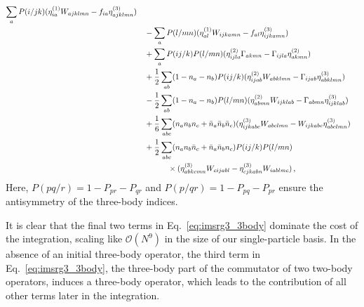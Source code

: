 \begin{align}
\begin{aligned}
    \sum_{a} P(i/jk) (\eta^{(1)}_{ia} W_{ajklmn} - f_{ia} \eta^{(3)}_{ajklmn})                                                     \\
                                      & \quad - \sum_{a} P(l/mn) (\eta^{(1)}_{al} W_{ijkamn} - f_{al} \eta^{(3)}_{ijkamn})         \\
                                      & \quad + \sum_{a} P(ij/k) P(l/mn)
    (\eta^{(2)}_{ijla} \Gamma_{akmn} - \Gamma_{ijla} \eta^{(2)}_{akmn})                                                              \\
                                      & \quad + \frac{1}{2} \sum_{ab} (1 - n_a - n_b) P(ij/k)
    (\eta^{(2)}_{ijab} W_{abklmn} - \Gamma_{ijab} \eta^{(3)}_{abklmn})                                                             \\
                                      & \quad - \frac{1}{2} \sum_{ab} (1 - n_a - n_b) P(l/mn)
    (\eta^{(2)}_{abmn} W_{ijklab} - \Gamma_{abmn} \eta^{(3)}_{ijklab})                                                             \\
                                      & \quad + \frac{1}{6} \sum_{abc} (n_a n_b n_c + \bar{n}_a \bar{n}_b \bar{n}_c)
    (\eta^{(3)}_{ijkabc} W_{abclmn} - W_{ijkabc} \eta^{(3)}_{abclmn})                                                            \\
                                      & \quad + \frac{1}{2} \sum_{abc} (n_a n_b \bar{n}_c + \bar{n}_a \bar{n}_b n_c)
    P(ij/k)P(l/mn)                                                                                                             \\
                                      & \qquad \qquad \times (\eta^{(3)}_{abkcmn} W_{cijabl} -\eta^{(3)}_{cjkabn} W_{iablmc})\,,
  \end{aligned}\label{eq:imsrg3_3body}
\end{align}
Here, $P(pq/r) = 1 - P_{pr} - P_{qr}$ and $P(p/qr) = 1 - P_{pq} - P_{pr}$
ensure the antisymmetry of the three-body indices.

It is clear that the final two terms in Eq.~\eqref{eq:imsrg3_3body}
dominate the cost of the integration,
scaling like $\mathcal{O}(N^9)$ in the size of our single-particle basis.
In the absence of an initial three-body operator,
the third term in Eq.~\eqref{eq:imsrg3_3body},
the three-body part of the commutator of two two-body operators,
induces a three-body operator,
which leads to the contribution of all other terms later in the integration.

